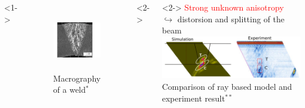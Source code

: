 \documentclass[11pt,xcolor=x11names,compress, notes=show]{beamer}%
\begin{document}
\begin{frame}{\insertsectionhead}
\vspace{-1cm}
\hspace{1cm}
	\begin{columns}[c]
			<1->
			\centering
			\begin{figure}
				\includegraphics[height=2.7cm]{./img/soudure1.png}\\
				{\centering \tiny Macrography of a weld$^{*}$}
			\end{figure}
			<2->
			\hspace{-3cm}
			\vspace{2cm}
			<2->
			\hspace{-1cm}
			\textcolor{red}{Strong unknown anisotropy}\\
			$\hookrightarrow$ distorsion and splitting of the beam\\[0.2cm]
			\hspace{-0.5cm}
			\includegraphics[scale=0.5]{img/gardahaut.png}\\
			{\centering \tiny Comparison of ray based model and experiment result$^{**}$}
				

\end{columns}
\end{frame}
\end{document}
